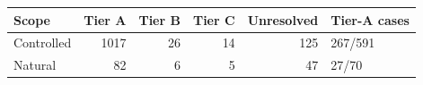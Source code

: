 \begin{tabular}{lrrrrl}
\toprule
Scope & Tier A & Tier B & Tier C & Unresolved & Tier-A cases\\
\midrule
Controlled & 1017 & 26 & 14 & 125 & 267/591\\
Natural & 82 & 6 & 5 & 47 & 27/70\\
\bottomrule
\end{tabular}
